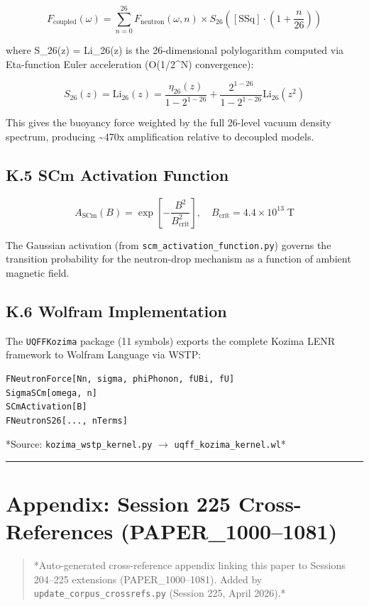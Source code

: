 \documentclass[11pt]{article}
\begin{document}
$$F_{\mathrm{coupled}}(\omega) = \sum_{n=0}^{26} F_{\mathrm{neutron}}(\omega, n) \times S_{26}\!\left([\text{SSq}] \cdot \left(1 + \frac{n}{26}\right)\right)$$

where S\_26(z) = Li\_26(z) is the 26-dimensional polylogarithm computed via Eta-function Euler acceleration (O(1/2\textasciicircum{}N) convergence):

$$S_{26}(z) = \text{Li}_{26}(z) = \frac{\eta_{26}(z)}{1 - 2^{1-26}} + \frac{2^{1-26}}{1 - 2^{1-26}} \text{Li}_{26}(z^2)$$

This gives the buoyancy force weighted by the full 26-level vacuum density spectrum, producing \textasciitilde{}470x amplification relative to decoupled models.

\subsection*{K.5 SCm Activation Function}

$$A_{\mathrm{SCm}}(B) = \exp\!\left[-\frac{B^2}{B_{\mathrm{crit}}^2}\right], \quad B_{\mathrm{crit}} = 4.4 \times 10^{13} \;\text{T}$$

The Gaussian activation (from \verb|scm_activation_function.py|) governs the transition probability for the neutron-drop mechanism as a function of ambient magnetic field.

\subsection*{K.6 Wolfram Implementation}

The \verb|UQFFKozima| package (11 symbols) exports the complete Kozima LENR framework to Wolfram Language via WSTP:

\begin{verbatim}
FNeutronForce[Nn, sigma, phiPhonon, fUBi, fU]
SigmaSCm[omega, n]
SCmActivation[B]
FNeutronS26[..., nTerms]
\end{verbatim}

*Source: \verb|kozima_wstp_kernel.py| $\to$ \verb|uqff_kozima_kernel.wl|*

\noindent\rule{\textwidth}{0.4pt}

\section*{Appendix: Session 225 Cross-References (PAPER\_1000--1081)}

\begin{quote}
*Auto-generated cross-reference appendix linking this paper to
Sessions 204--225 extensions (PAPER\_1000--1081). Added by
\verb|update_corpus_crossrefs.py| (Session 225, April 2026).*
\end{quote}
\end{document}
